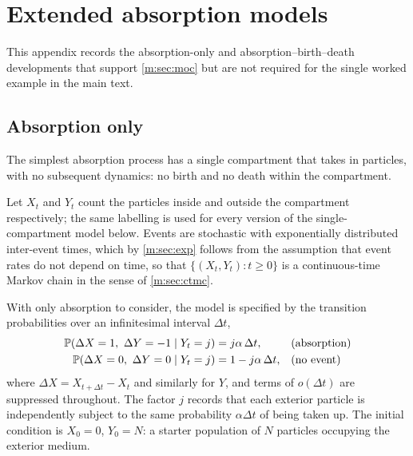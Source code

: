 \renewcommand{\thesection}{\thechapter.\Alph{section}}
\setcounter{section}{0}

\section{Extended absorption models}
\label{m:app:moc-extended}

This appendix records the absorption-only and absorption--birth--death
developments that support \cref{m:sec:moc} but are not required for the single worked
example in the main text.

\subsection{Absorption only}
\label{m:sec:absonly}

The simplest absorption process has a single compartment that takes in particles,
with no subsequent dynamics: no birth and no death within the compartment.

Let $X_t$ and $Y_t$ count the particles inside and outside the compartment
respectively; the same labelling is used for every version of the
single-compartment model below. Events are stochastic with exponentially
distributed inter-event times, which by \cref{m:sec:exp} follows from the assumption
that event rates do not depend on time, so that $\{(X_t,Y_t):t\ge0\}$ is a
continuous-time Markov chain in the sense of \cref{m:sec:ctmc}.

With only absorption to consider, the model is specified by the transition
probabilities over an infinitesimal interval $\Delta t$,
\begin{align*}
\mathbb{P}\!\left(\Delta X = 1,\ \Delta Y = -1 \mid Y_t = j\right) &= j\alpha\,\Delta t, &&\text{(absorption)}\\
\mathbb{P}\!\left(\Delta X = 0,\ \Delta Y = 0 \mid Y_t = j\right) &= 1-j\alpha\,\Delta t, &&\text{(no event)}
\end{align*}
where $\Delta X = X_{t+\Delta t}-X_t$ and similarly for $Y$, and terms of
$o(\Delta t)$ are suppressed throughout. The factor $j$ records that each exterior
particle is independently subject to the same probability $\alpha\Delta t$ of being
taken up. The initial condition is $X_0=0$, $Y_0=N$: a starter population of $N$
particles occupying the exterior medium.

